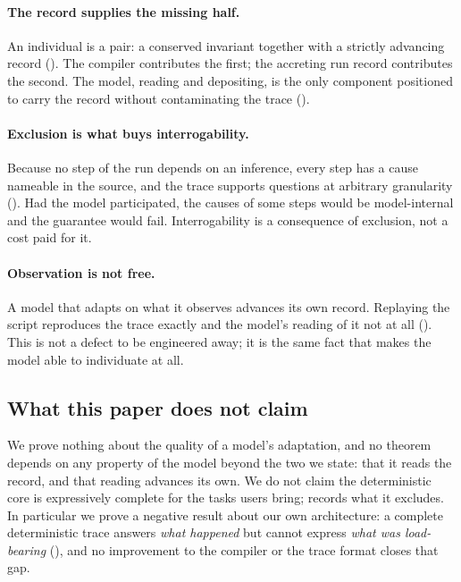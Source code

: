 \documentclass[twocolumn,11pt,a4paper]{article}
\theoremstyle{sup}
\theoremstyle{definition}
\theoremstyle{remark}
\begin{document}
\paragraph{The record supplies the missing half.} An individual is a pair: a
conserved invariant together with a strictly advancing record
(). The compiler contributes the first; the accreting
run record contributes the second. The model, reading and depositing, is the
only component positioned to carry the record without contaminating the trace
().

\paragraph{Exclusion is what buys interrogability.} Because no step of the run
depends on an inference, every step has a cause nameable in the source, and the
trace supports questions at arbitrary granularity (). Had the
model participated, the causes of some steps would be model-internal and the
guarantee would fail. Interrogability is a consequence of exclusion, not a
cost paid for it.

\paragraph{Observation is not free.} A model that adapts on what it observes
advances its own record. Replaying the script reproduces the trace exactly and
the model's reading of it not at all (). This is not
a defect to be engineered away; it is the same fact that makes the model able
to individuate at all.

\subsection{What this paper does not claim}

We prove nothing about the quality of a model's adaptation, and no theorem
depends on any property of the model beyond the two we state: that it reads the
record, and that reading advances its own. We do not claim the deterministic
core is expressively complete for the tasks users bring; 
records what it excludes. In particular we prove a negative result about our own
architecture: a complete deterministic trace answers \emph{what happened} but
cannot express \emph{what was load-bearing} (), and no
improvement to the compiler or the trace format closes that gap.
\end{document}
